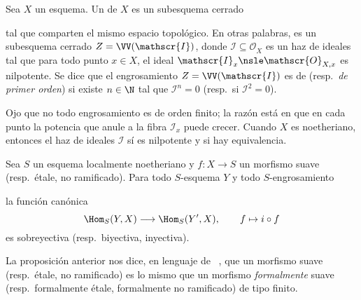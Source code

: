 \begin{mydef}
	Sea $X$ un esquema.
	Un \footnotemark{} de $X$ es un subesquema cerrado 
	tal que comparten el mismo espacio topológico.
	En otras palabras, es un subesquema cerrado $Z = \VV(\mathscr{I})$, donde $\mathscr{I \subseteq O}_X$ es un haz de ideales
	tal que para todo punto $x \in X$, el ideal $\mathscr{I}_x \nsle \mathscr{O}_{X, x}$ es nilpotente.
	Se dice que el engrosamiento $Z = \VV(\mathscr{I})$ es de 
	(resp.\ \emph{de primer orden}) si existe $n \in \N$ tal que $\mathscr{I}^n = 0$ (resp.\ si $\mathscr{I}^2 = 0$).
\end{mydef}

\warn
Ojo que no todo engrosamiento es de orden finito;
la razón está en que en cada punto la potencia que anule a la fibra $\mathscr{I}_x$ puede crecer.
Cuando $X$ es noetheriano, entonces el haz de ideales $\mathscr{I}$ sí es nilpotente y si hay equivalencia.

\begin{prop}
	Sea $S$ un esquema localmente noetheriano y $f \colon X \to S$ un morfismo suave (resp.\ étale, no ramificado).
	Para todo $S$-esquema $Y$ y todo $S$-engrosamiento 
	la función canónica
	\begin{equation*}
		\Hom_S(Y, X) \longrightarrow \Hom_S(Y', X), \qquad f \mapsto i\circ f
	\end{equation*}
	es sobreyectiva (resp.\ biyectiva, inyectiva).
\end{prop}
La proposición anterior nos dice, en lenguaje de \citeauthor{gortz:algebraic_ii}~\cite[36-40]{gortz:algebraic_ii},
que un morfismo suave (resp.\ étale, no ramificado) es lo mismo que
un morfismo \textit{formalmente} suave (resp.\ formalmente étale, formalmente no ramificado) de tipo finito.

